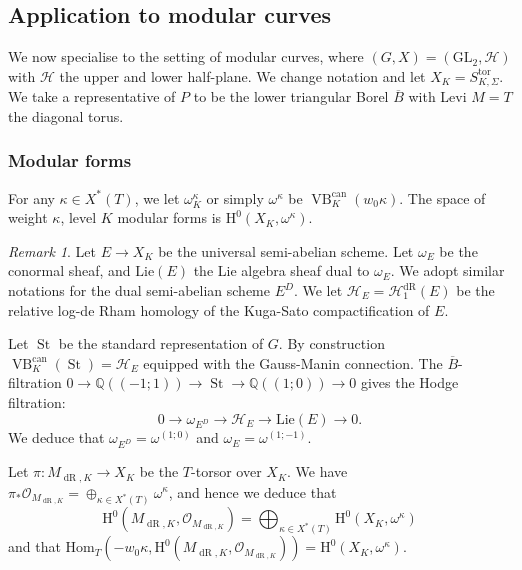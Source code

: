 \documentclass[10pt, oneside]{amsart}
\numberwithin{equation}{subsection}
\theoremstyle{definition}
\theoremstyle{remark}
\newtheorem{remark}[equation]{Remark}
\newcommand{\opn}[1]{\operatorname{#1}}
\def\Q{\mathbb{Q}}
\begin{document}
\subsection{Application to modular curves} \label{ApplicationToModularCurvesAppendix}

We now specialise to the setting of modular curves, where $(G,X) = (\mathrm{GL}_2, \mathcal{H})$ with $\mathcal{H}$ the upper and lower half-plane. We change notation and let $X_K = S_{K,\Sigma}^{\opn{tor}}$. We take a representative of $P$ to be the lower triangular Borel $\overline{B}$ with Levi $M=T$ the diagonal torus. 

\subsubsection{Modular forms}
For any $\kappa \in X^*(T)$, we let $\omega^{\kappa}_K$ or simply $\omega^\kappa$ be $\opn{VB}^{\opn{can}}_K(w_0\kappa)$. The space of weight $\kappa$, level $K$ modular forms is $\mathrm{H}^0(X_K, \omega^\kappa)$. 

\begin{remark} 
Let $E \rightarrow X_K$ be the universal semi-abelian scheme. Let $\omega_E$ be the conormal sheaf, and $\mathrm{Lie}(E)$ the Lie algebra sheaf dual to $\omega_E$. We adopt similar notations for the dual semi-abelian scheme $E^D$. We let $\mathcal{H}_E = \mathcal{H}_{1}^{\opn{dR}}(E)$ be the relative log-de Rham homology of the Kuga-Sato compactification of $E$. 

Let $\opn{St}$ be the standard representation of $G$. By construction $\opn{VB}_K^{\opn{can}}(\opn{St}) = \mathcal{H}_E$ equipped with the Gauss-Manin connection. The $\overline{B}$-filtration $0 \rightarrow \Q((-1;1)) \rightarrow \opn{St} \rightarrow \Q((1;0))\rightarrow 0$ gives the Hodge filtration:
$$0 \rightarrow \omega_{E^D} \rightarrow \mathcal{H}_{E} \rightarrow \mathrm{Lie}(E) \rightarrow 0.$$
We deduce that $\omega_{E^D} = \omega^{(1;0)}$ and $\omega_E = \omega^{(1; -1)}$. 
\end{remark}

Let $\pi \colon M_{\opn{dR},K} \rightarrow X_K$ be the $T$-torsor over $X_K$. We have $\pi_* \mathcal{O}_{M_{\opn{dR},K}} = \oplus_{\kappa \in X^*(T)} \omega^\kappa$, and hence we deduce that 
\[
\mathrm{H}^0(M_{\opn{dR},K}, \mathcal{O}_{M_{\opn{dR},K}}) = \bigoplus_{\kappa \in X^*(T)} \mathrm{H}^0(X_K, \omega^\kappa)
\]
and that $\mathrm{Hom}_{T}(-w_0\kappa, \mathrm{H}^0(M_{\opn{dR},K}, \mathcal{O}_{M_{\opn{dR},K}})) = \mathrm{H}^0(X_K, \omega^\kappa)$. 
\end{document}
